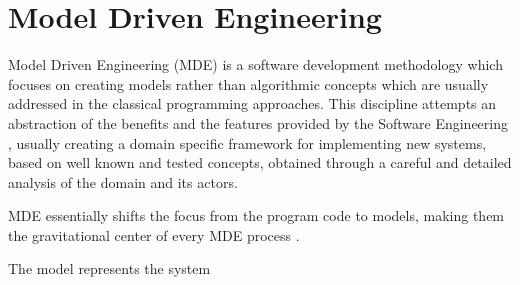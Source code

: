 \section{Model Driven Engineering}
\label{ModelDrivenEngineering}
Model Driven Engineering (MDE) is a software development methodology which focuses on creating models rather than algorithmic concepts which are usually addressed in the classical programming approaches.
This discipline attempts an abstraction of the benefits and the features provided by the Software Engineering \cite{Marrone}, usually creating a domain specific framework for implementing new systems, based on well known and tested concepts, obtained through a careful and detailed analysis of the domain and its actors.

MDE essentially shifts the focus from the program code to models, making them the gravitational center of every MDE process \cite{Lukman08}. 

The model represents the system \cite{Papa11}

% 


% 


 
